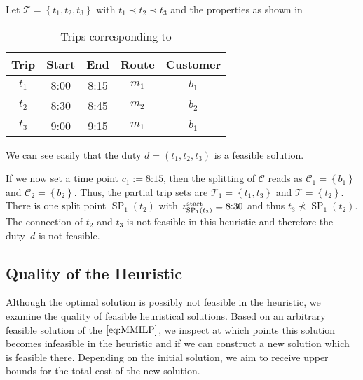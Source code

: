 \begin{example}
\label{ex:equivalence_MMILP_CMILP}

Let ${\mathcal{T}=\left\{t_1, t_2, t_3\right\}}$ with ${t_1\prec t_2\prec t_3}$ and the properties as shown in 

\begin{table}[htb]
	\centering
	\begin{tabular}{c|cccc}
		Trip & Start & End & Route & Customer \\
		\hline
		$t_1$ & 8:00 & 8:15 & $m_1$ & $b_1$ \\
		$t_2$ & 8:30 & 8:45 & $m_2$ & $b_2$ \\
		$t_3$ & 9:00 & 9:15 & $m_1$ & $b_1$ \\
	\end{tabular}
	\caption{Trips corresponding to }
	\label{tab:customer_heuristic_example}
\end{table}

We can see easily that the duty ${d=\left(t_1,t_2,t_3\right)}$ is a feasible solution. 

If we now set a time point ${c_1 := \text{8:15}}$, then the splitting of $\mathcal{C}$ reads as ${\mathcal{C}_1=\left\{b_1\right\}}$ and ${\mathcal{C}_2=\left\{b_2\right\}}$. Thus, the partial trip sets are ${\mathcal{T}_1=\left\{t_1,t_3\right\}}$ and ${\mathcal{T}=\left\{t_2\right\}}$. There is one split point ${\operatorname{SP}_1\left(t_2\right)}$ with ${z^{\operatorname{start}}_{\operatorname{SP}_1\left(t_2\right)} = \text{8:30}}$ and thus ${t_3\not\prec\operatorname{SP}_1\left(t_2\right)}$. The connection of $t_2$ and $t_3$ is not feasible in this heuristic and therefore the duty~$d$ is not feasible.

\end{example}


\subsection{Quality of the Heuristic}

Although the optimal solution is possibly not feasible in the heuristic, we examine the quality of feasible heuristical solutions. Based on an arbitrary feasible solution of the $\eqref{eq:MMILP}$, we inspect at which points this solution becomes infeasible in the heuristic and if we can construct a new solution which is feasible there. Depending on the initial solution, we aim to receive upper bounds for the total cost of the new solution. 

